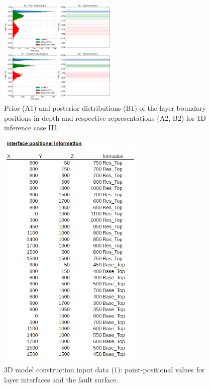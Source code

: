 \documentclass[a4paper,11pt]{MScThesis}
\begin{document}
	\begin{figure}[h]
		\centering
		\includegraphics[width=0.50\textwidth]{Figures/Appendix/update_smallres1}
		\caption{Prior (A1) and posterior distributions (B1) of the layer boundary positions in depth and respective representations (A2, B2) for 1D inference case III.}\label{fig:update_smallres1}
	\end{figure}

    \begin{figure}[h]
    	\centering
    	\includegraphics[width=0.62\textwidth]{Figures/Appendix/CSV_input1}
    	\caption{3D model construction input data (1): point-positional values for layer interfaces and the fault surface.}\label{fig:CSV_input1}
    \end{figure}
\end{document}
